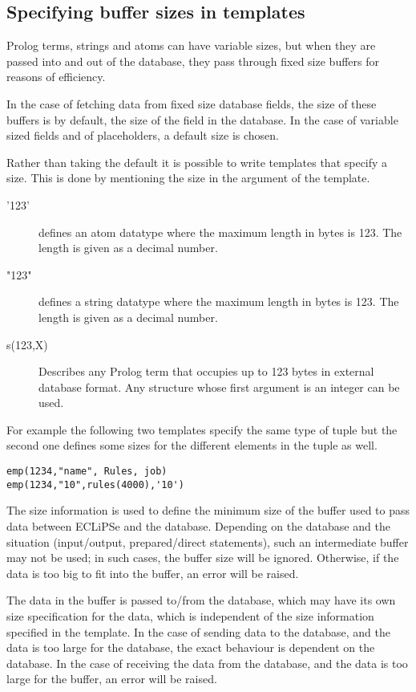 \subsection{Specifying buffer sizes in templates}
Prolog terms, strings and atoms can have variable sizes, but when they are
passed into and out of the database, they pass through fixed size buffers
for reasons of efficiency.

In the case of fetching data from fixed size database fields, the size of
these buffers is by default, the size of the field in the database.
In the case of variable sized fields and of placeholders, a default size
is chosen.

Rather than taking the default it is possible to write templates that
specify a size. This is done by mentioning the size in the argument of
the template.

\begin{description}
\item['123'] defines an atom datatype where the maximum length in
bytes is 123. The length is given as a decimal number.

\item["123"] defines a string datatype where the maximum length in
bytes is 123. The length is given as a decimal number.

\item[s(123,X)] Describes any Prolog term that occupies up to 123 bytes
in external database format. Any structure whose first argument is an integer
can be used.
\end{description}

For example the following two templates specify the same type of tuple
but the second one defines some sizes for the different elements in the
tuple as well.
\begin{verbatim}
emp(1234,"name", Rules, job)
emp(1234,"10",rules(4000),'10')
\end{verbatim}

The size information is used to define the minimum size of the buffer used
to pass data between ECLiPSe and the database. Depending on the database
and the situation (input/output, prepared/direct statements), such an 
intermediate buffer may not be used; in such cases, the buffer size will be
ignored. Otherwise, if the data is too big to fit into the buffer, an error
will be raised. 

The data in the buffer is passed to/from the database, which may have its own
size specification for the data, which is independent of the size
information specified in the template. In the case of sending data to the
database, and the data is too large for the database, the exact behaviour
is dependent on the database. In the case of receiving the data from the
database, and the data is too large for the buffer, an error will be raised.

